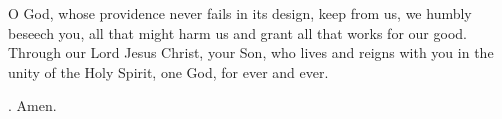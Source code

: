 \lettrine[lines=3]{O}{} God, whose providence never fails in its design,
keep from us, we humbly beseech you,
all that might harm us
and grant all that works for our good.
Through our Lord Jesus Christ, your Son,
who lives and reigns with you in the unity of the Holy Spirit,
one God, for ever and ever. \par \Rbar. Amen.
